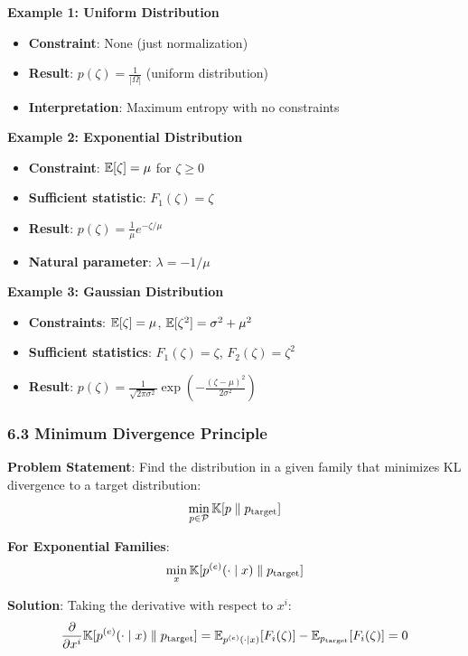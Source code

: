 \documentclass{amsart}
\let\originalmathbb\mathbb
\renewcommand{\mathbb}[1]{%
    \ifstrequal{#1}{1}{\mathbbm{#1}}{\originalmathbb{#1}}%
}
\theoremstyle{plain}
\theoremstyle{definition}
\theoremstyle{remark}
\begin{document}
\textbf{Example 1: Uniform Distribution}

\begin{itemize}
	\item \textbf{Constraint}: None (just normalization)
	\item \textbf{Result}: $p(\zeta) = \frac{1}{|\Omega|}$ (uniform distribution)
	\item \textbf{Interpretation}: Maximum entropy with no constraints
\end{itemize}

\textbf{Example 2: Exponential Distribution}

\begin{itemize}
	\item \textbf{Constraint}: $\mathbb{E}[\zeta] = \mu$ for $\zeta \geq 0$
	\item \textbf{Sufficient statistic}: $F_1(\zeta) = \zeta$
	\item \textbf{Result}: $p(\zeta) = \frac{1}{\mu} e^{-\zeta/\mu}$
	\item \textbf{Natural parameter}: $\lambda = -1/\mu$
\end{itemize}

\textbf{Example 3: Gaussian Distribution}

\begin{itemize}
	\item \textbf{Constraints}: $\mathbb{E}[\zeta] = \mu$, $\mathbb{E}[\zeta^2] = \sigma^2 + \mu^2$
	\item \textbf{Sufficient statistics}: $F_1(\zeta) = \zeta$, $F_2(\zeta) = \zeta^2$
	\item \textbf{Result}: $p(\zeta) = \frac{1}{\sqrt{2\pi\sigma^2}} \exp\left(-\frac{(\zeta-\mu)^2}{2\sigma^2}\right)$
\end{itemize}

\subsubsection{6.3 Minimum Divergence Principle}

\textbf{Problem Statement}: Find the distribution in a given family that minimizes KL divergence to a target distribution:
\[
\min_{p \in \mathcal{P}} \mathbb{K}[p \parallel p_{\text{target}}]
\]

\textbf{For Exponential Families}:
\[
\min_x \mathbb{K}[p^{(e)}(\cdot \mid x) \parallel p_{\text{target}}]
\]

\textbf{Solution}:
Taking the derivative with respect to $x^i$:
\[
\frac{\partial}{\partial x^i} \mathbb{K}[p^{(e)}(\cdot \mid x) \parallel p_{\text{target}}] = \mathbb{E}_{p^{(e)}(\cdot \mid x)}[F_i(\zeta)] - \mathbb{E}_{p_{\text{target}}}[F_i(\zeta)] = 0
\]
\end{document}
